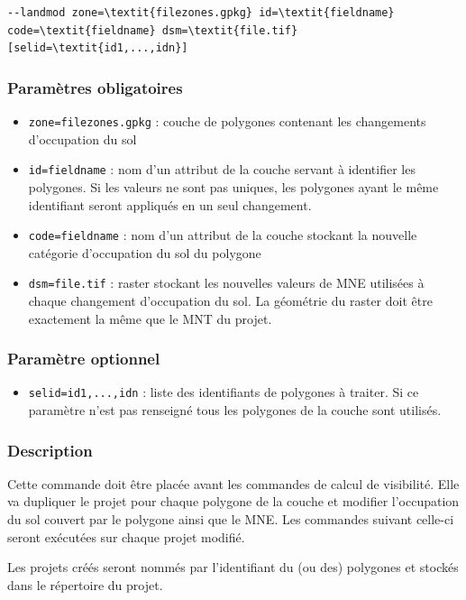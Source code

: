 \documentclass{report}
\begin{document}
\begin{Verbatim}[commandchars=\\\{\}]
--landmod zone=\textit{filezones.gpkg} id=\textit{fieldname} code=\textit{fieldname} dsm=\textit{file.tif} [selid=\textit{id1,...,idn}]
\end{Verbatim}

\subsubsection{Paramètres obligatoires}
\begin{itemize}
	\item \verb|zone=filezones.gpkg| : couche de polygones contenant les changements d'occupation du sol
	\item \verb|id=fieldname| : nom d'un attribut de la couche servant à identifier les polygones. Si les valeurs ne sont pas uniques, les polygones ayant le même identifiant seront appliqués en un seul changement.
	\item \verb|code=fieldname| : nom d'un attribut de la couche stockant la nouvelle catégorie d'occupation du sol du polygone
	\item \verb|dsm=file.tif| : raster stockant les nouvelles valeurs de MNE utilisées à chaque changement d'occupation du sol. La géométrie du raster doit être exactement la même que le MNT du projet.
\end{itemize}

\subsubsection{Paramètre optionnel}
\begin{itemize}
	\item \verb|selid=id1,...,idn| : liste des identifiants de polygones à traiter. Si ce paramètre n'est pas renseigné tous les polygones de la couche sont utilisés.
\end{itemize}

\subsubsection{Description}
Cette commande doit être placée avant les commandes de calcul de visibilité. Elle va dupliquer le projet pour chaque polygone de la couche et modifier l'occupation du sol couvert par le polygone ainsi que le MNE. Les commandes suivant celle-ci seront exécutées sur chaque projet modifié.

Les projets créés seront nommés par l'identifiant du (ou des) polygones et stockés dans le répertoire du projet.
\end{document}
